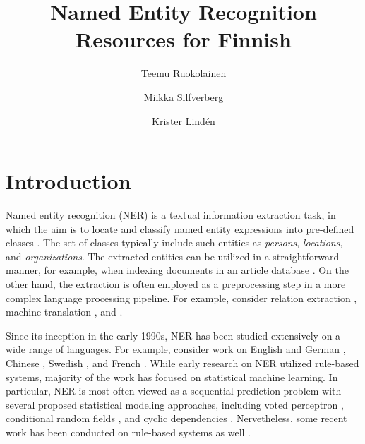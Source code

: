 \documentclass[11pt]{article}
\begin{document}
\title{Named Entity Recognition Resources for Finnish}
\author{Teemu Ruokolainen \and Miikka Silfverberg \and Krister Lind\'en}



\maketitle


\begin{abstract}
\noindent 

\end{abstract}

\section{Introduction}
\label{sec: introduction}

Named entity recognition (NER) is a textual information extraction task, in which the aim is to locate and classify named entity expressions into pre-defined classes \citep{nadeau2007}. The set of classes typically include such entities as \textit{persons}, \textit{locations}, and \textit{organizations}. The extracted entities can be utilized in a straightforward manner, for example, when indexing documents in an article database \citep{}. On the other hand, the extraction is often employed as a preprocessing step in a more complex language processing pipeline. For example, consider relation extraction \citep{}, machine translation \citep{}, and \citep{}.

Since its inception in the early 1990s, NER has been studied extensively on a wide range of languages. For example, consider work on English and German \citep{tjong2003}, Chinese \citep{bai2001}, Swedish \citep{dalianis2001}, and French \citep{petasis2001,poibeau2003}. While early research on NER utilized rule-based systems, majority of the work has focused on statistical machine learning. In particular, NER is most often viewed as a sequential prediction problem with several proposed statistical modeling approaches, including voted perceptron \citep{}, conditional random fields \citep{}, and cyclic dependencies \citep{}. Nervetheless, some recent work has been conducted on rule-based systems as well \citep{}. 

\end{document}
